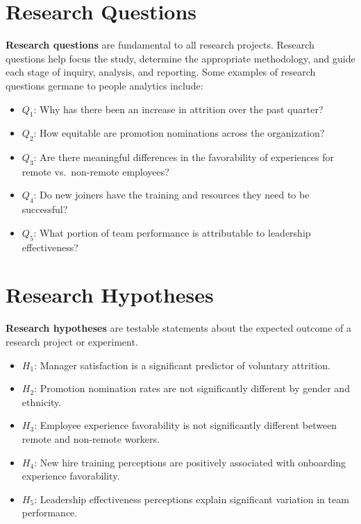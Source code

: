 \documentclass[]{book}
\providecommand{\tightlist}{%
  \setlength{\itemsep}{0pt}\setlength{\parskip}{0pt}}
\begin{document}
\hypertarget{research-questions}{%
\section{Research Questions}\label{research-questions}}

\textbf{Research questions} are fundamental to all research projects. Research questions help focus the study, determine the appropriate methodology, and guide each stage of inquiry, analysis, and reporting. Some examples of research questions germane to people analytics include:

\begin{itemize}
\tightlist
\item
  \(Q_1\): Why has there been an increase in attrition over the past quarter?
\item
  \(Q_2\): How equitable are promotion nominations across the organization?
\item
  \(Q_3\): Are there meaningful differences in the favorability of experiences for remote vs.~non-remote employees?
\item
  \(Q_4\): Do new joiners have the training and resources they need to be successful?
\item
  \(Q_5\): What portion of team performance is attributable to leadership effectiveness?
\end{itemize}

\hypertarget{research-hypotheses}{%
\section{Research Hypotheses}\label{research-hypotheses}}

\textbf{Research hypotheses} are testable statements about the expected outcome of a research project or experiment.

\begin{itemize}
\tightlist
\item
  \(H_1\): Manager satisfaction is a significant predictor of voluntary attrition.
\item
  \(H_2\): Promotion nomination rates are not significantly different by gender and ethnicity.
\item
  \(H_3\): Employee experience favorability is not significantly different between remote and non-remote workers.
\item
  \(H_4\): New hire training perceptions are positively associated with onboarding experience favorability.
\item
  \(H_5\): Leadership effectiveness perceptions explain significant variation in team performance.
\end{itemize}
\end{document}
